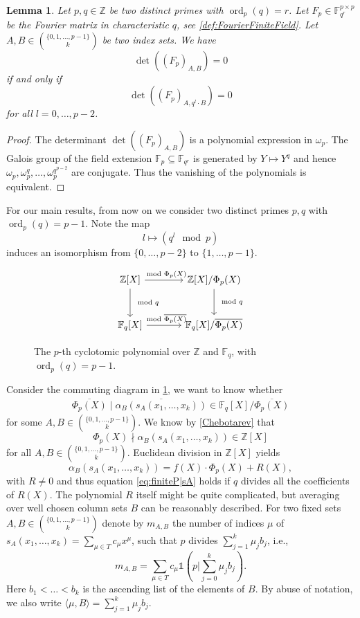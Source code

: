 \documentclass[a4paper]{article}
\renewcommand{\o}{\omega}
\newcommand{\Z}{\ensuremath{\mathbb{Z}}}
\newcommand{\F}{\mathbb{F}}
\newcommand{\ord}{\operatorname{ord}}
\newtheorem{lemma}[theorem]{Lemma}
\numberwithin{equation}{section}
\numberwithin{table}{section}
\numberwithin{figure}{section}
\begin{document}
\begin{lemma}\label{shiftIndicesCharq}
    Let $p,q \in \Z$ be two distinct primes with $\ord_p(q)=r$. 
    Let $F_p\in \F_{q^r}^{p \times p}$ be the Fourier matrix in characteristic $q$, see \cref{def:FourierFiniteField}.
    Let $A,B \in \binom{\{0,1,\ldots,p-1\}}{k}$ be two index sets. We have
    \[
    \det((F_p)_{A,B})=0
    \]
    if and only if
    \[
    \det((F_p)_{A,q^l \cdot B})=0
    \]
    for all $l=0,\ldots,p-2$.
\end{lemma}

\begin{proof}
    The determinant $\det((F_p)_{A,B})$ is a polynomial expression in $\o_p$. The Galois group of the field extension $\F_p \subseteq \F_{q^r}$ is generated by $Y \mapsto Y^q$ and hence $\o_p,\o_p^q,\ldots,\o_p^{q^{p-2}}$ are conjugate. Thus the vanishing of the polynomials is equivalent.
\end{proof}

For our main results, from now on we consider two distinct primes $p,q$ with $\ord_p(q)=p-1$. Note the map
\[l \mapsto (q^l \mod p)\]
induces an isomorphism from $\{0,\ldots,p-2\}$ to $\{1,\ldots,p-1\}$.
\begin{figure}[h]
    \centering
        \[\begin{tikzcd}[row sep=large, column sep=large]
            \Z[X] \arrow{r}{ \mod \Phi_p(X)} \arrow{d}{\mod q}  &    \Z[X]/\Phi_p(X) \arrow{d}{\mod q} \\
             \F_q[X] \arrow{r}{\mod \overline{\Phi_p(X)}}  & \F_q[X]/\overline{\Phi_p(X)}
            \end{tikzcd}
        \]
    \caption{The $p$-th cyclotomic polynomial over $\Z$ and $\F_q$, with $\ord_p(q)=p-1$.}
    \label{fig:CyclotomicFinite}
\end{figure}
\newline
Consider the commuting diagram in \cref{fig:CyclotomicFinite}, we want to know whether 
\begin{align}\label{eq:finiteP|sA}
\overline{\Phi_p(X)} \mid \overline{\alpha_B(s_A(x_1,\ldots,x_k))} \in \F_q[X]/\overline{\Phi_p(X)}
\end{align}
for some $A,B \in \binom{\{0,1,\ldots,p-1\}}{k}$. We know by \cref{Chebotarev} that
\[
\Phi_p(X) \nmid \alpha_B(s_A(x_1,\ldots,x_k)) \in \Z[X]
\]
for all $A,B \in \binom{\{0,1,\ldots,p-1\}}{k}$. Euclidean division in $\Z[X]$ yields
\[
\alpha_B(s_A(x_1,\ldots,x_k)) = f(X) \cdot \Phi_p(X) + R(X),
\]
with $R\neq 0$ and thus equation \cref{eq:finiteP|sA} holds if $q$ divides all the coefficients of $R(X)$. The polynomial $R$ itself might be quite complicated, but averaging over well chosen column sets $B$ can be reasonably described. For two fixed sets $A,B \in \binom{\{0,1,\ldots,p-1\}}{k}$ denote by $m_{A,B}$ the number of indices $\mu$ of $s_A(x_1,\ldots,x_k)=\sum_{\mu \in T} c_\mu x^\mu$, such that $p$ divides $\sum_{j=1}^k\mu_jb_j$, i.e.,
\[
m_{A,B}=\sum_{\mu \in T} c_\mu \mathds{1}\left(p \big| \sum_{j=0}^k\mu_jb_j\right).
\]
Here $b_1<\ldots < b_k$ is the ascending list of the elements of $B$. By abuse of notation, we also write $\langle \mu , B \rangle=\sum_{j=1}^k\mu_jb_j$.
\end{document}
